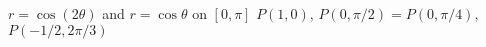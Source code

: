 {$r=\cos(2\theta)$ and $r=\cos\theta$ on $[0,\pi]$}
{$P(1,0)$, $P(0,\pi/2)=P(0,\pi/4)$, $P(-1/2,2\pi/3)$
}
